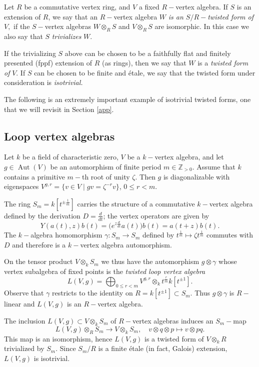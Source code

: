 \documentclass{article}
\theoremstyle{definition}
\def\Aut{\ensuremath{\operatorname{Aut}}}
\begin{document}
Let $R$ be a commutative vertex ring, and $V$  a fixed  $R-$vertex algebra. If $S$ is an extension of $R$, we say that an $R-$vertex algebra $W$ {\it is an $S/R-$twisted form of}  $V,$ if the $S-$vertex algebras $W \otimes_R S$ and $V \otimes_R S$ are isomorphic. In this case we also say that $S$ {\it trivializes} $W.$

 If the trivializing $S$ above can be chosen to be a faithfully flat and finitely presented (fppf) extension of $R$ (as rings), then we say that $W$ is a {\it twisted form of} $V.$ If $S$ can be chosen to be finite and \'etale, we say that the twisted form under consideration is {\it isotrivial.}

The following is an extremely important example of isotrivial twisted forms, one that we will revisit in Section \ref{app}.

\subsection{Loop vertex algebras}\label{loopva}

    Let $k$ be a field of characteristic zero,
     $V$ be a $k-$vertex algebra, and let $g \in \Aut(V)$ be an automorphism of finite period $m \in \mathbb Z_{> 0}$.
    Assume that $k$ contains a primitive $m-$th root of unity $\zeta.$ Then $g$ is diagonalizable with eigenspaces $V^{g,r} = \{ v \in V \mid gv = \zeta^{-r} v \}$, $0 \leq r < m$.

    The ring $S_m = k[t^{\pm\frac{1}{m}}]$ carries the structure of a commutative $k-$vertex algebra defined by the derivation $D = \frac{d}{dt}$; the vertex operators are given by 
    \[Y(a(t),z)b(t) = \big( e^{z \frac{d}{dt}} a(t)\big) b(t) = a(t+z)b(t).\]
    The $k-$algebra homomorphism $\gamma \colon S_m \to S_m$ defined by $t^{\frac{1}{m}} \mapsto \zeta t^{\frac{1}{m}}$ commutes with $D$ and therefore is a $k-$vertex algebra automorphism.
    
    On the tensor product $V \otimes_k S_m$ we thus have the automorphism $g \otimes \gamma$ whose vertex subalgebra of fixed points is the \emph{twisted loop vertex algebra} \[L(V,g) = \bigoplus_{0 \leq r < m} V^{g,r} \otimes_{k} t^{\frac{r}{m}} k[t^{\pm 1}] .\]
    Observe that $\gamma$ restricts to the identity on $R = k[t^{\pm 1}] \subset S_m.$ Thus $g \otimes \gamma$ is $R-$linear and $L(V,g)$ is an $R-$vertex algebra.

    The inclusion $L(V,g) \subset V \otimes_k S_m$ of $R-$vertex algebras induces an $S_m-$map \[ L(V,g) \otimes_R S_m \to V \otimes_k S_m, \quad v \otimes q \otimes p \mapsto v \otimes pq. \] 
    This map is an isomorphism, hence $L(V,g)$ is a twisted form of $V \otimes_k R$ trivialized by $S_m.$
Since  $S_m/R$ is a finite \'etale (in fact, Galois) extension, $L(V,g)$ is isotrivial.
\end{document}
